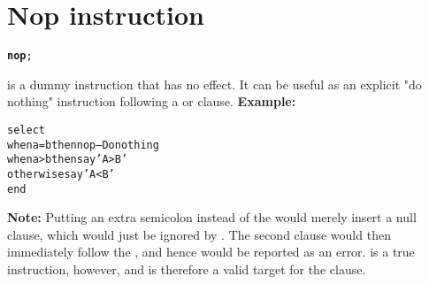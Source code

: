 \chapter{Nop instruction}
\begin{shaded}
\begin{alltt}
\textbf{nop};
\end{alltt}
\end{shaded}
  is a dummy instruction that has no effect.  It can be
useful as an explicit "do nothing" instruction following a
 or  clause.
 \textbf{Example:}
\begin{alltt}
select
  when a=b then nop           -- Do nothing
  when a>b then say 'A > B'
  otherwise     say 'A < B'
  end
\end{alltt}
\begin{shaded}\noindent
\textbf{Note: }Putting an extra semicolon instead of the  would
merely insert a null clause, which would just be ignored by \nr{}.
The second  clause would then immediately follow the
, and hence would be reported as an error.
 is a true instruction, however, and is therefore a valid
target for the  clause.
\end{shaded}\indent